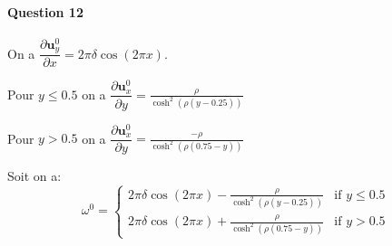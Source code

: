 \documentclass{article}
\newcommand{\pd}[2]{\dfrac{\partial#1}{\partial#2}}
\begin{document}
\paragraph{Question 12}
On a $\pd{\mathbf{u}_y^0}{x}=2\pi\delta\cos(2\pi x)$.

Pour $y \leq 0.5$ on a $\pd{\mathbf{u}_x^0}{y}=\frac{\rho}{\cosh^2(\rho(y-0.25))}$

Pour $y > 0.5$ on a $\pd{\mathbf{u}_x^0}{y}=\frac{-\rho}{\cosh^2(\rho(0.75-y))}$


Soit on a:
\begin{equation*}
	\omega^0 =
	\begin{cases}
		2\pi\delta\cos(2\pi x) - \frac{\rho}{\cosh^2(\rho(y-0.25))} & \text{if }y\leq 0.5 \\
		2\pi\delta\cos(2\pi x) + \frac{\rho}{\cosh^2(\rho(0.75-y))}  & \text{if }y > 0.5
	\end{cases}
\end{equation*}
\end{document}
